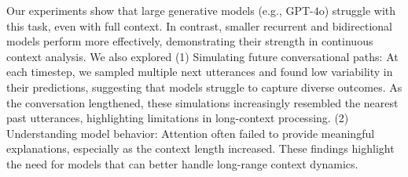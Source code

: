 Our experiments show that large generative models (e.g., GPT-$4$o) struggle with this task, even with full context.
%
In contrast, smaller recurrent and bidirectional models perform more effectively, demonstrating their strength in continuous context analysis.
%
We also explored
%
(1) Simulating future conversational paths: At each timestep, we sampled multiple next utterances and found low variability in their predictions, suggesting that models struggle to capture diverse outcomes.
%
As the conversation lengthened, these simulations increasingly resembled the nearest past utterances, highlighting limitations in long-context processing.
%
(2) Understanding model behavior: Attention often failed to provide meaningful explanations, especially as the context length increased.
%
These findings highlight the need for models that can better handle long-range context dynamics.
